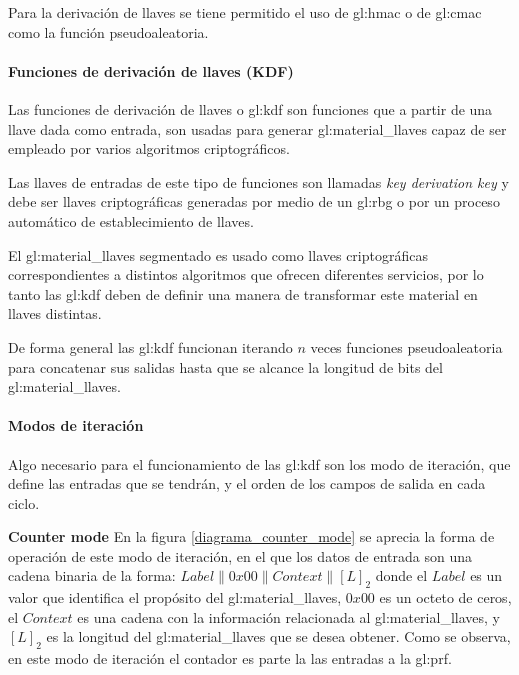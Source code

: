Para la derivación de llaves se tiene permitido el uso de \gls{gl:hmac} o 
de \gls{gl:cmac} como la función pseudoaleatoria.

\paragraph{Funciones de derivación de llaves (KDF)}
Las funciones de derivación de llaves o \gls{gl:kdf} son funciones que a 
partir de una llave dada como entrada, son usadas para generar 
\gls{gl:material_llaves} capaz de ser empleado por varios algoritmos 
criptográficos. 

Las llaves de entradas de este tipo de funciones son llamadas \textit{key 
derivation key} y debe ser llaves criptográficas generadas por medio de un 
\gls{gl:rbg} o por un proceso automático de establecimiento de llaves.

El \gls{gl:material_llaves} segmentado es usado como llaves criptográficas 
correspondientes a distintos algoritmos que ofrecen diferentes servicios, por 
lo tanto las \gls{gl:kdf} deben de definir una manera de transformar este 
material en llaves distintas.

De forma general las \gls{gl:kdf} funcionan iterando $n$ veces funciones 
pseudoaleatoria para concatenar sus salidas hasta que se alcance la longitud 
de bits del \gls{gl:material_llaves}.

\paragraph{Modos de iteración}

Algo necesario para el funcionamiento de las \gls{gl:kdf} son los modo de 
iteración, que define las entradas que se tendrán, y el orden de los campos 
de salida en cada ciclo.

\textbf{Counter mode}
En la figura \ref{diagrama_counter_mode} se aprecia la forma de operación de 
este modo de iteración, en el que los datos de entrada son una cadena binaria 
de la forma: $Label \parallel 0x00 \parallel Context \parallel {[L]}_2$ 
donde el $Label$ es un valor que identifica el propósito del 
\gls{gl:material_llaves}, $0x00$ es un octeto de ceros, el $Context$ es una 
cadena con la información relacionada al \gls{gl:material_llaves}, y 
${[L]}_2$ es la longitud del \gls{gl:material_llaves} que se desea obtener.
Como se observa, en este modo de iteración el contador es parte la las 
entradas a la \gls{gl:prf}.

